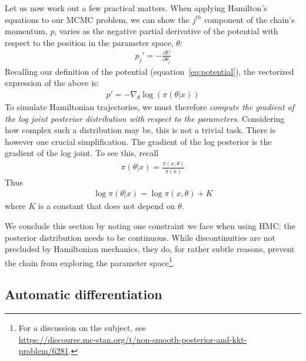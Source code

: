 \documentclass[11pt]{article}
\begin{document}
  Let us now work out a few practical matters.
  When applying Hamilton's equations to our MCMC problem, we can show the $j^{th}$ 
  component of the chain's momentum, $p$, varies as the negative partial derivative of 
  the potential with respect to the position in the parameter space, $\theta$:
  \begin{eqnarray*}
    p_j' = - \frac{\partial{U}}{\partial{\theta_j}}
  \end{eqnarray*}
  Recalling our definition of the potential (equation~\ref{eq:potential}), the vectorized 
  expression of the above is:
  \begin{eqnarray}
    p' = - \nabla_\theta \log(\pi(\theta | x))
  \label{eq:gradient}
  \end{eqnarray}
  To simulate Hamiltonian trajectories, we must therefore \textit{compute the gradient 
  of the log joint posterior distribution with respect to the parameters}.
  Considering how complex such a distribution may be, this is not a trivial task.
  There is however one crucial simplification.
  The gradient of the log posterior is the gradient of the log joint.
  To see this, recall
  \begin{eqnarray*}
    \pi(\theta | x) = \frac{\pi (x, \theta)}{\pi(x)}
  \end{eqnarray*}
  Thus
  \begin{eqnarray*}
    \log \pi(\theta | x) = \log \pi(x, \theta) + K
  \end{eqnarray*}
  where $K$ is a constant that does not depend on $\theta$.
  
  We conclude this section by noting one constraint we face when using HMC: the posterior distribution 
  needs to be continuous. While discontinuities are not precluded by Hamiltonian mechanics,
  they do, for rather subtle reasons, prevent the
  chain from exploring the parameter space\footnote{For a discussion on the subject,
  see \\ \url{https://discourse.mc-stan.org/t/non-smooth-posterior-and-kkt-problem/6281}.}. 
  
  \subsection{Automatic differentiation}
\end{document}
